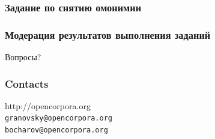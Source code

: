 \documentclass{beamer}
\begin{document}
\begin{frame}
\frametitle{Задание по снятию омонимии}
\begin{figure}
\end{figure}
\end{frame}

\begin{frame}
\frametitle{Модерация результатов выполнения заданий}
\begin{figure}
\end{figure}
\end{frame}

\begin{frame}
Вопросы?
\end{frame}

\begin{frame}
\frametitle{Contacts}
\begin{center}
\LARGE http://opencorpora.org\\[\bigskipamount]
\Large\texttt{granovsky@opencorpora.org\\bocharov@opencorpora.org}
\end{center}
\end{frame}
\end{document}
